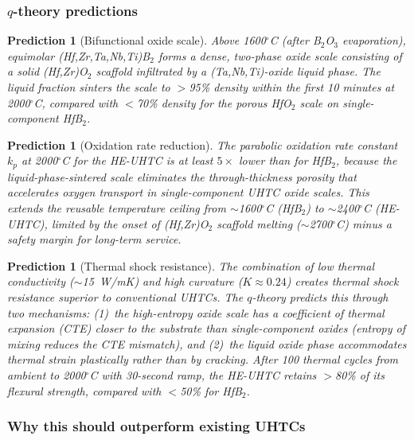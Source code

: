 \documentclass[12pt,letterpaper]{article}
\newtheorem{prediction}[theorem]{Prediction}
\theoremstyle{definition}
\begin{document}
\subsubsection{$q$-theory predictions}

\begin{prediction}[Bifunctional oxide scale]\label{pred:ceramic_oxide}
Above 1600$^\circ$C (after B$_2$O$_3$ evaporation), equimolar (Hf,Zr,Ta,Nb,Ti)B$_2$ forms a dense, two-phase oxide scale consisting of a solid (Hf,Zr)O$_2$ scaffold infiltrated by a (Ta,Nb,Ti)-oxide liquid phase.  The liquid fraction sinters the scale to $>$95\% density within the first 10 minutes at 2000$^\circ$C, compared with $<$70\% density for the porous HfO$_2$ scale on single-component HfB$_2$.
\end{prediction}

\begin{prediction}[Oxidation rate reduction]\label{pred:ceramic_rate}
The parabolic oxidation rate constant $k_p$ at 2000$^\circ$C for the HE-UHTC is at least $5\times$ lower than for HfB$_2$, because the liquid-phase-sintered scale eliminates the through-thickness porosity that accelerates oxygen transport in single-component UHTC oxide scales.  This extends the reusable temperature ceiling from $\sim$1600$^\circ$C (HfB$_2$) to $\sim$2400$^\circ$C (HE-UHTC), limited by the onset of (Hf,Zr)O$_2$ scaffold melting ($\sim$2700$^\circ$C) minus a safety margin for long-term service.
\end{prediction}

\begin{prediction}[Thermal shock resistance]\label{pred:ceramic_shock}
The combination of low thermal conductivity ($\sim$15~W/mK) and high curvature ($K \approx 0.24$) creates thermal shock resistance superior to conventional UHTCs.  The $q$-theory predicts this through two mechanisms: (1)~the high-entropy oxide scale has a coefficient of thermal expansion (CTE) closer to the substrate than single-component oxides (entropy of mixing reduces the CTE mismatch), and (2)~the liquid oxide phase accommodates thermal strain plastically rather than by cracking.  After 100 thermal cycles from ambient to 2000$^\circ$C with 30-second ramp, the HE-UHTC retains $>$80\% of its flexural strength, compared with $<$50\% for HfB$_2$.
\end{prediction}

\subsubsection{Why this should outperform existing UHTCs}
\end{document}
